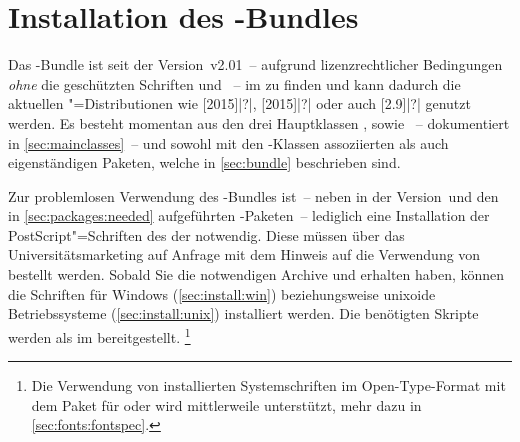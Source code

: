 \section{Installation des \TUDScript-Bundles}
\label{sec:install}%
%
%
%
Das \TUDScript-Bundle ist seit der Version~v2.01~-- aufgrund lizenzrechtlicher 
Bedingungen \emph{ohne} die geschützten Schriften \Univers und \DIN~-- im 
\foreignlanguage{english}{%
} zu finden und kann dadurch die aktuellen "=Distributionen wie 
[2015]|?|, 
[2015]|?| oder auch
[2.9]|?| genutzt werden. Es besteht momentan aus 
den drei Hauptklassen ,  sowie 
~-- dokumentiert in \autoref{sec:mainclasses}~-- und sowohl 
mit den \TUDScript-Klassen assoziierten als auch eigenständigen Paketen, welche 
in \autoref{sec:bundle} beschrieben sind.

Zur problemlosen Verwendung des \TUDScript-Bundles ist~-- neben \KOMAScript{} in
der Version~\vKOMAScript und den in \autoref{sec:packages:needed} aufgeführten 
-Paketen~-- lediglich eine Installation der PostScript"=Schriften 
des \CDs der \TnUD notwendig. Diese müssen über das Universitätsmarketing auf 
%
{Anfrage} mit dem Hinweis auf die Verwendung von  bestellt 
werden. Sobald Sie die notwendigen Archive  und 
 erhalten haben, können die Schriften für Windows 
(\autoref{sec:install:win}) beziehungsweise unixoide Betriebssysteme 
(\autoref{sec:install:unix}) installiert werden. Die benötigten Skripte 
werden als  
im \GitHubRepo* bereitgestellt.%
\footnote{%
  Die Verwendung von installierten Systemschriften im Open-Type-Format mit dem 
  Paket  für  oder  wird 
  mittlerweile unterstützt, mehr dazu in \autoref{sec:fonts:fontspec}.%
}

